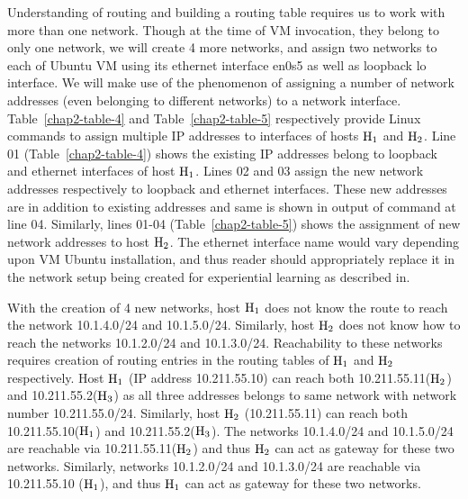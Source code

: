 \begin{multicols}{2}
Understanding of routing and building a routing table requires us to work with more than one network. Though at the time of VM invocation, they belong to only one network, we will create 4 more networks, and assign two networks to each of Ubuntu VM using its ethernet interface en0s5 as well as loopback lo interface. We will make use of the phenomenon of assigning a number of network addresses (even belonging to different networks) to a network interface.  Table~\ref{chap2-table-4} and Table~\ref{chap2-table-5} respectively provide Linux commands to assign multiple IP addresses to interfaces of hosts ${\rm H}_{1}$ and ${\rm H}_{2}$. Line 01 (Table~\ref{chap2-table-4}) shows the existing IP addresses belong to loopback and ethernet interfaces of host ${\rm H}_{1}$.  Lines 02 and 03 assign the new network addresses respectively to loopback and ethernet interfaces. These new addresses are in addition to existing addresses and same is shown in output of command at line 04. Similarly, lines 01-04 (Table~\ref{chap2-table-5}) shows the assignment of new network addresses to host ${\rm H}_{2}$. The ethernet interface name would vary depending upon VM Ubuntu installation, and thus reader should appropriately replace it in the network setup being created for experiential learning as described in.

With the creation of 4 new networks, host ${\rm H}_{1}$ does not know the route to reach the network 10.1.4.0/24 and 10.1.5.0/24. Similarly, host ${\rm H}_{2}$ does not know how to reach the networks 10.1.2.0/24 and 10.1.3.0/24. Reachability to these networks requires creation of routing entries in the routing tables of ${\rm H}_{1}$ and ${\rm H}_{2}$ respectively. Host ${\rm H}_{1}$ (IP address 10.211.55.10) can reach both 10.211.55.11(${\rm H}_{2}$) and 10.211.55.2(${\rm H}_{3}$) as all three addresses belongs to same network with network number 10.211.55.0/24. Similarly, host ${\rm H}_{2}$ (10.211.55.11) can reach both 10.211.55.10(${\rm H}_{1}$) and 10.211.55.2(${\rm H}_{3}$). The networks 10.1.4.0/24 and 10.1.5.0/24 are reachable via 10.211.55.11(${\rm H}_{2}$) and thus ${\rm H}_{2}$ can act as gateway for these two networks. Similarly, networks 10.1.2.0/24 and 10.1.3.0/24 are reachable via 10.211.55.10 (${\rm H}_{1}$), and thus ${\rm H}_{1}$ can act as gateway for these two networks. 
\end{multicols}

